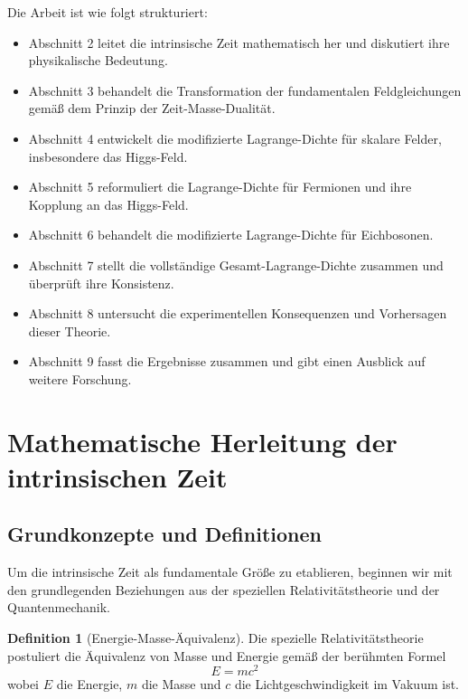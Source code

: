 \documentclass{article}
\theoremstyle{definition}
\newtheorem{definition}[theorem]{Definition}
\theoremstyle{remark}
\begin{document}
		Die Arbeit ist wie folgt strukturiert:
		
		\begin{itemize}
			\item Abschnitt 2 leitet die intrinsische Zeit mathematisch her und diskutiert ihre physikalische Bedeutung.
			\item Abschnitt 3 behandelt die Transformation der fundamentalen Feldgleichungen gemäß dem Prinzip der Zeit-Masse-Dualität.
			\item Abschnitt 4 entwickelt die modifizierte Lagrange-Dichte für skalare Felder, insbesondere das Higgs-Feld.
			\item Abschnitt 5 reformuliert die Lagrange-Dichte für Fermionen und ihre Kopplung an das Higgs-Feld.
			\item Abschnitt 6 behandelt die modifizierte Lagrange-Dichte für Eichbosonen.
			\item Abschnitt 7 stellt die vollständige Gesamt-Lagrange-Dichte zusammen und überprüft ihre Konsistenz.
			\item Abschnitt 8 untersucht die experimentellen Konsequenzen und Vorhersagen dieser Theorie.
			\item Abschnitt 9 fasst die Ergebnisse zusammen und gibt einen Ausblick auf weitere Forschung.
		\end{itemize}
		
		\section{Mathematische Herleitung der intrinsischen Zeit}
		
		\subsection{Grundkonzepte und Definitionen}
		
		Um die intrinsische Zeit als fundamentale Größe zu etablieren, beginnen wir mit den grundlegenden Beziehungen aus der speziellen Relativitätstheorie und der Quantenmechanik.
		
		\begin{definition}[Energie-Masse-Äquivalenz]
			Die spezielle Relativitätstheorie postuliert die Äquivalenz von Masse und Energie gemäß der berühmten Formel
			\begin{equation}
				E = mc^2
			\end{equation}
			wobei $E$ die Energie, $m$ die Masse und $c$ die Lichtgeschwindigkeit im Vakuum ist.
		\end{definition}
		
\end{document}
